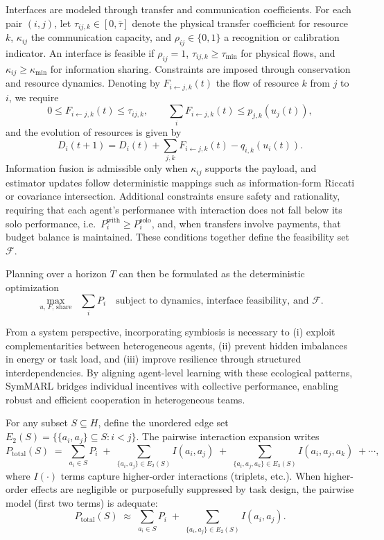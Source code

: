Interfaces are modeled through transfer and communication coefficients. For each pair $(i,j)$, let $\tau_{ij,k}\in[0,\bar\tau]$ denote the physical transfer coefficient for resource $k$, $\kappa_{ij}$ the communication capacity, and $\rho_{ij}\in\{0,1\}$ a recognition or calibration indicator. An interface is feasible if $\rho_{ij}=1$, $\tau_{ij,k}\ge\tau_{\min}$ for physical flows, and $\kappa_{ij}\ge\kappa_{\min}$ for information sharing. Constraints are imposed through conservation and resource dynamics. Denoting by $F_{i\leftarrow j,k}(t)$ the flow of resource $k$ from $j$ to $i$, we require
\[
0 \leq F_{i\leftarrow j,k}(t) \leq \tau_{ij,k}, \qquad
\sum_{i}F_{i\leftarrow j,k}(t) \leq p_{j,k}(u_j(t)),
\]
and the evolution of resources is given by
\[
D_i(t{+}1) = D_i(t)+\sum_{j,k}F_{i\leftarrow j,k}(t) - q_{i,k}(u_i(t)).
\]
Information fusion is admissible only when $\kappa_{ij}$ supports the payload, and estimator updates follow deterministic mappings such as information-form Riccati or covariance intersection. Additional constraints ensure safety and rationality, requiring that each agent’s performance with interaction does not fall below its solo performance, i.e.\ $P_i^{\text{with}} \ge P_i^{\text{solo}}$, and, when transfers involve payments, that budget balance is maintained. These conditions together define the feasibility set $\mathcal{F}$.

Planning over a horizon $T$ can then be formulated as the deterministic optimization
\[
\max_{u,\,F,\,\text{share}} \;\; \sum_{i} P_i
\quad \text{subject to dynamics, interface feasibility, and } \mathcal{F}.
\]

From a system perspective, incorporating symbiosis is necessary to (i) exploit complementarities between heterogeneous agents, (ii) prevent hidden imbalances in energy or task load, and (iii) improve resilience through structured interdependencies. By aligning agent-level learning with these ecological patterns, SymMARL bridges individual incentives with collective performance, enabling robust and efficient cooperation in heterogeneous teams. 


For any subset $S\subseteq H$, define the unordered edge set $E_2(S)=\{\{a_i,a_j\}\subseteq S: i<j\}$.
The pairwise interaction expansion writes
\begin{equation}
\label{eq:system-performance}
P_{\mathrm{total}}(S)\;=\;\sum_{a_i\in S} P_i\;+\;\sum_{\{a_i,a_j\}\in E_2(S)} I(a_i,a_j)\;+\;\sum_{\{a_i,a_j,a_k\}\in E_3(S)} I(a_i,a_j,a_k)\;+\cdots,
\end{equation}
where $I(\cdot)$ terms capture higher-order interactions (triplets, etc.). When higher-order effects are negligible or purposefully suppressed by task design, the pairwise model (first two terms) is adequate:
\begin{equation}
\label{eq:pairwise-only}
P_{\mathrm{total}}(S)\;\approx\;\sum_{a_i\in S} P_i\;+\;\sum_{\{a_i,a_j\}\in E_2(S)} I(a_i,a_j).
\end{equation}

